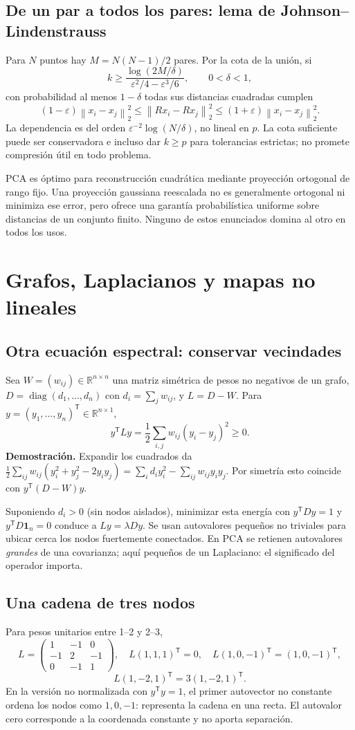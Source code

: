 \documentclass[11pt,a4paper]{article}
\newcommand{\R}{\mathbb R}
\newcommand{\T}{^{\mathsf T}}
\newcommand{\norm}[1]{\left\lVert #1\right\rVert}
\DeclareMathOperator{\diag}{diag}
\newcommand{\ones}{\mathbf 1}
\theoremstyle{definition}
\begin{document}
\subsection{De un par a todos los pares: lema de Johnson--Lindenstrauss}
Para $N$ puntos hay $M=N(N-1)/2$ pares. Por la cota de la unión, si
\[
k\ge\frac{\log(2M/\delta)}{\varepsilon^2/4-\varepsilon^3/6},\qquad0<\delta<1,
\]
con probabilidad al menos $1-\delta$ todas sus distancias cuadradas cumplen
\[
(1-\varepsilon)\norm{x_i-x_j}_2^2\le\norm{Rx_i-Rx_j}_2^2
\le(1+\varepsilon)\norm{x_i-x_j}_2^2.
\]
La dependencia es del orden $\varepsilon^{-2}\log(N/\delta)$, no lineal en $p$. La cota suficiente puede ser conservadora e incluso dar $k\ge p$ para tolerancias estrictas; no promete compresión útil en todo problema.
\begin{cuidado}
PCA es óptimo para reconstrucción cuadrática mediante proyección ortogonal de rango fijo. Una proyección gaussiana reescalada no es generalmente ortogonal ni minimiza ese error, pero ofrece una garantía probabilística uniforme sobre distancias de un conjunto finito. Ninguno de estos enunciados domina al otro en todos los usos.
\end{cuidado}

\section{Grafos, Laplacianos y mapas no lineales}
\subsection{Otra ecuación espectral: conservar vecindades}
Sea $W=(w_{ij})\in\R^{n\times n}$ una matriz simétrica de pesos no negativos de un grafo, $D=\diag(d_1,\ldots,d_n)$ con $d_i=\sum_jw_{ij}$, y $L=D-W$. Para $y=(y_1,\ldots,y_n)\T\in\R^{n\times1}$,
\[
\boxed{y\T Ly=\frac12\sum_{i,j}w_{ij}(y_i-y_j)^2\ge0}.
\]
\textbf{Demostración.} Expandir los cuadrados da $\frac12\sum_{ij}w_{ij}(y_i^2+y_j^2-2y_iy_j)=\sum_i d_i y_i^2-\sum_{ij}w_{ij}y_iy_j$. Por simetría esto coincide con $y\T(D-W)y$.

Suponiendo $d_i>0$ (sin nodos aislados), minimizar esta energía con $y\T Dy=1$ y $y\T D\ones_n=0$ conduce a $Ly=\lambda Dy$. Se usan autovalores pequeños no triviales para ubicar cerca los nodos fuertemente conectados. En PCA se retienen autovalores \emph{grandes} de una covarianza; aquí pequeños de un Laplaciano: el significado del operador importa.
\subsection{Una cadena de tres nodos}
Para pesos unitarios entre 1--2 y 2--3,
\[
L=\begin{pmatrix}1&-1&0\\-1&2&-1\\0&-1&1\end{pmatrix},\quad
L(1,1,1)\T=0,\quad L(1,0,-1)\T=(1,0,-1)\T,
\]
\[
L(1,-2,1)\T=3(1,-2,1)\T.
\]
En la versión no normalizada con $y\T y=1$, el primer autovector no constante ordena los nodos como $1,0,-1$: representa la cadena en una recta. El autovalor cero corresponde a la coordenada constante y no aporta separación.
\end{document}
